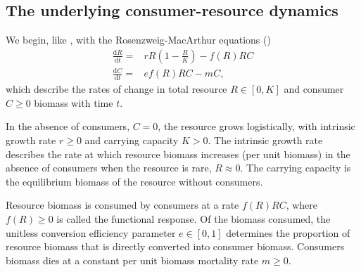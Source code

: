 \documentclass[11pt]{article}
\begin{document}
\subsection*{The underlying consumer-resource dynamics}
We begin, like \cite{Gilbert2014}, with the Rosenzweig-MacArthur equations (\cite{Rosenzweig1963})
\begin{equation}\label{eq:RM}
\begin{aligned}
\frac{\mathrm{d}R}{\mathrm{d}t} =& r R \left(1 - \frac{R}{K} \right) - f(R) R C\\
\frac{\mathrm{d}C}{\mathrm{d}t} =& e f(R) R C - m C,
\end{aligned}
\end{equation}
which describe the rates of change in total resource $R\in[0,K]$ and consumer $C\geq0$ biomass with time $t$.

In the absence of consumers, $C=0$, the resource grows logistically, with intrinsic growth rate $r\geq0$ and carrying capacity $K>0$.
The intrinsic growth rate describes the rate at which resource biomass increases (per unit biomass) in the absence of consumers when the resource is rare, $R\approx0$.
The carrying capacity is the equilibrium biomass of the resource without consumers.

Resource biomass is consumed by consumers at a rate $f(R) R C$, where $f(R)\geq0$ is called the functional response.
Of the biomass consumed, the unitless conversion efficiency parameter $e\in[0,1]$ determines the proportion of resource biomass that is directly converted into consumer biomass.
Consumers biomass dies at a constant per unit biomass mortality rate $m\geq0$.
\end{document}
